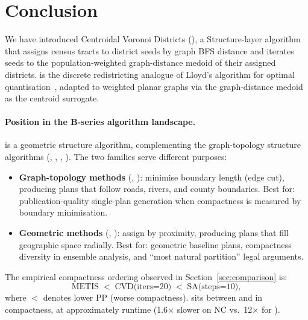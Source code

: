 \section{Conclusion}
\label{sec:conclusion}

We have introduced Centroidal Voronoi Districts (\cvd{}), a Structure-layer
algorithm that assigns census tracts to district seeds by graph BFS distance
and iterates seeds to the population-weighted graph-distance medoid of their
assigned districts.
\cvd{} is the discrete redistricting analogue of Lloyd's algorithm for
optimal quantisation~\citep{lloyd1982,du1999}, adapted to weighted planar
graphs via the graph-distance medoid as the centroid surrogate.

\paragraph{Position in the B-series algorithm landscape.}
\cvd{} is a geometric structure algorithm, complementing the graph-topology
structure algorithms (\metis{}, \sa{}, \geosec{}, \areasec{}).
The two families serve different purposes:
\begin{itemize}
\item \textbf{Graph-topology methods} (\metis{}, \sa{}): minimise boundary
  length (edge cut), producing plans that follow roads, rivers, and county
  boundaries.
  Best for: publication-quality single-plan generation when compactness is
  measured by boundary minimisation.
\item \textbf{Geometric methods} (\cvd{}, \bfsgrowth{}): assign by proximity,
  producing plans that fill geographic space radially.
  Best for: geometric baseline plans, compactness diversity in ensemble
  analysis, and ``most natural partition'' legal arguments.
\end{itemize}

The empirical compactness ordering observed in Section~\ref{sec:comparison} is:
\[
  \text{METIS} \;<\; \text{CVD(iters=20)} \;<\; \text{SA(steps=10)},
\]
where $<$ denotes lower PP (worse compactness).
\cvd{} sits between \metis{} and \sa{} in compactness, at approximately
\metis{} runtime (1.6$\times$ slower on NC vs.\ 12$\times$ for \sa{}).

